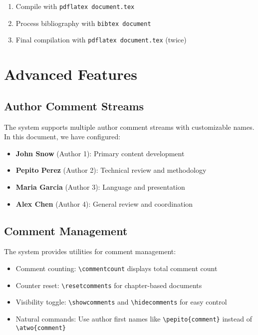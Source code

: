 \documentclass[manuscript]{acmart}
\begin{document}

\begin{enumerate}
\item Compile with \texttt{pdflatex document.tex}
\item Process bibliography with \texttt{bibtex document}
\item Final compilation with \texttt{pdflatex document.tex} (twice)
\end{enumerate}


\section{Advanced Features}

\subsection{Author Comment Streams}

The system supports multiple author comment streams with customizable names. In this document, we have configured:

\begin{itemize}
\item \textbf{John Snow} (Author 1): Primary content development
\item \textbf{Pepito Perez} (Author 2): Technical review and methodology  
\item \textbf{Maria Garcia} (Author 3): Language and presentation
\item \textbf{Alex Chen} (Author 4): General review and coordination
\end{itemize}


\subsection{Comment Management}

The system provides utilities for comment management:


\begin{itemize}
\item Comment counting: \verb|\commentcount| displays total comment count
\item Counter reset: \verb|\resetcomments| for chapter-based documents
\item Visibility toggle: \verb|\showcomments| and \verb|\hidecomments| for easy control
\item Natural commands: Use author first names like \verb|\pepito{comment}| instead of \verb|\atwo{comment}|
\end{itemize}
\end{document}
